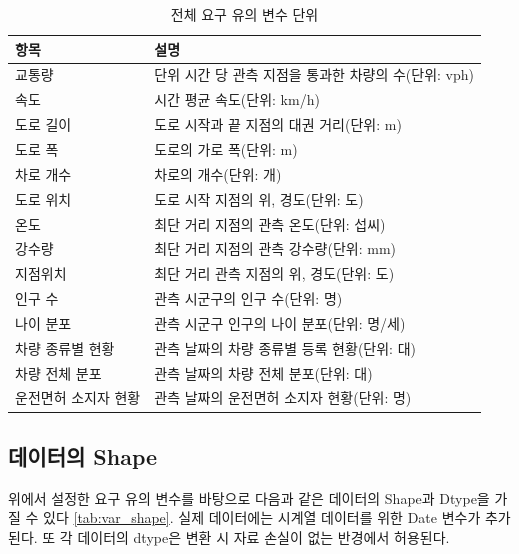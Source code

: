 \documentclass[11pt]{report}
\begin{document}
\begin{table}[]
	\begin{center}
	\vspace{0.5cm}
	\begin{tabular}{|l|l|}
		\hline
		\rowcolor[HTML]{C0C0C0} 
		항목          & 설명                                \\ \hline
		교통량         & 단위 시간 당 관측 지점을 통과한 차량의 수(단위: vph) \\ \hline
		속도          & 시간 평균 속도(단위: km/h)                \\ \hline
		도로 길이       & 도로 시작과 끝 지점의 대권 거리(단위: m)         \\ \hline
		도로 폭        & 도로의 가로 폭(단위: m)                   \\ \hline
		차로 개수       & 차로의 개수(단위: 개)                     \\ \hline
		도로 위치       & 도로 시작 지점의 위, 경도(단위: 도)            \\ \hline
		온도          & 최단 거리 지점의 관측 온도(단위: 섭씨)           \\ \hline
		강수량         & 최단 거리 지점의 관측 강수량(단위: mm)          \\ \hline
		지점위치        & 최단 거리 관측 지점의 위, 경도(단위: 도)         \\ \hline
		인구 수        & 관측 시군구의 인구 수(단위: 명)               \\ \hline
		나이 분포       & 관측 시군구 인구의 나이 분포(단위: 명/세)         \\ \hline
		차량 종류별 현황   & 관측 날짜의 차량 종류별 등록 현황(단위: 대)        \\ \hline
		차량 전체 분포    & 관측 날짜의 차량 전체 분포(단위: 대)            \\ \hline
		운전면허 소지자 현황 & 관측 날짜의 운전면허 소지자 현황(단위: 명)         \\ \hline
	\end{tabular}
	\end{center}
	\caption{전체 요구 유의 변수 단위}
	\label{tab:var_var}
\end{table}

\subsection{데이터의 Shape}
위에서 설정한 요구 유의 변수를 바탕으로 다음과 같은 데이터의 Shape과 Dtype을 가질 수 있다 \autoref{tab:var_shape}. 
실제 데이터에는 시계열 데이터를 위한 Date 변수가 추가된다. 
또 각 데이터의 dtype은 변환 시 자료 손실이 없는 반경에서 허용된다. 
\end{document}
